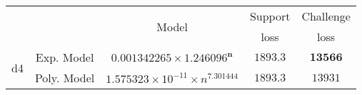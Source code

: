 \begin{tabular}{ccccc} 
\hline 
 &  & \multirow{2}{*}{Model} & Support & Challenge\tabularnewline 
 &  &  & loss  & loss\tabularnewline 
\hline 
\hline 
\multirow{2}{*}{d4} & Exp. Model & $\mathbf{0.001342265\times 1.246096^{n}}$ & $\mathbf{1893.3}$ & $\mathbf{13566}$ \tabularnewline 
 & Poly. Model & $1.575323\times10^{-11}\times n^{7.301444}$ & $1893.3$ & $13931$ \tabularnewline 
\hline 
\end{tabular} 

